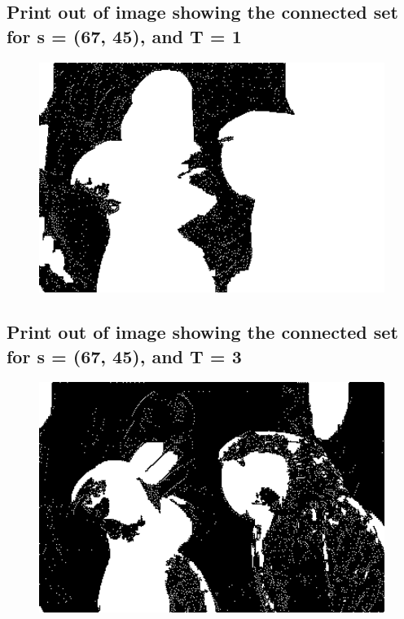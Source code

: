 \documentclass{article}
\begin{document}
\subsection{Print out of image showing the connected set for s = (67, 45), and T = 1}
\begin{figure}[H]
    \centering
    \includegraphics[width=1\textwidth]{../connected-set-1t.png}
    \begin{center}
    \end{center}
\end{figure}
\subsection{Print out of image showing the connected set for s = (67, 45), and T = 3}
\begin{figure}[H]
    \centering
    \includegraphics[width=1\textwidth]{../connected-set-3t.png}
    \begin{center}
    \end{center}
\end{figure}
\end{document}
